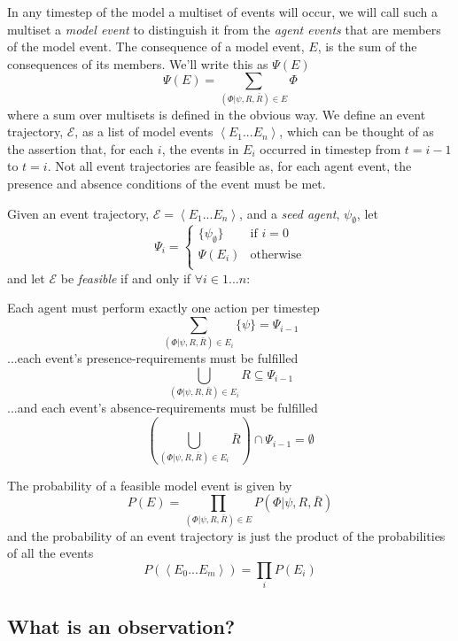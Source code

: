 \documentclass{article}
\begin{document}
In any timestep of the model a multiset of events will occur, we will call such a multiset a \textit{model event} to distinguish it from the \textit{agent events} that are members of the model event. The consequence of a model event, $E$, is the sum of the consequences of its members. We'll write this as $\Psi(E)$
\begin{equation}
\Psi(E) = \sum_{(\Phi|\psi,R,\bar{R})\in E}\Phi
\label{psie}
\end{equation}
where a sum over multisets is defined in the obvious way. We define an event trajectory, $\mathcal{E}$, as a list of model events $\left<E_1...E_n\right>$, which can be thought of as the assertion that, for each $i$, the events in $E_i$ occurred in timestep from $t=i-1$ to $t=i$. Not all event trajectories are feasible as, for each agent event, the presence and absence conditions of the event must be met.

Given an event trajectory, $\mathcal{E} = \left<E_1...E_n\right>$, and a \textit{seed agent},  $\psi_\emptyset$, let
\[
\Psi_i =
\begin{cases}
 \{\psi_\emptyset\} & \text{if }i=0\\
 \Psi(E_i) & \text{otherwise}\\
\end{cases}
\]
and let $\mathcal{E}$ be \textit{feasible} if and only if $\forall i\in 1...n:$

Each agent must perform exactly one action per timestep
\begin{equation}
\sum_{(\Phi|\psi,R,\bar{R})\in E_i}\{\psi\} = \Psi_{i-1}
\label{agency}
\end{equation}
...each event's presence-requirements must be fulfilled
\[
\bigcup_{(\Phi|\psi,R,\bar{R})\in E_i} R \subseteq \Psi_{i-1}
\]
...and each event's absence-requirements must be fulfilled
\[
\left(\bigcup_{(\Phi|\psi,R,\bar{R})\in E_i} \bar{R}\right) \cap \Psi_{i-1} = \emptyset
\]

The probability of a feasible model event is given by
\[
P(E) = \prod_{(\Phi|\psi,R,\bar{R}) \in E} P(\Phi|\psi,R,\bar{R})
\]
and the probability of an event trajectory is just the product of the probabilities of all the events
\[
P(\left<E_0...E_m\right>) = \prod_{i}P(E_i)
\]


\subsection{What is an observation?}
\end{document}
